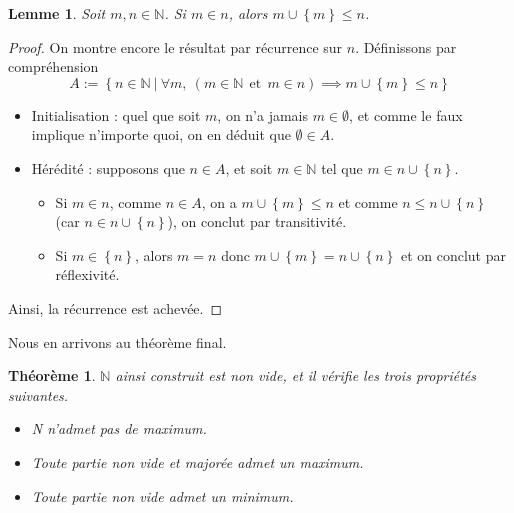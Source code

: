 \documentclass[french]{book}
\newcommand{\N}{\mathbb{N}}
\theoremstyle{plain}
\newtheorem{thm}{Théorème}[chapter]
\newtheorem{lem}{Lemme}[chapter]
\theoremstyle{definition}
\theoremstyle{remark}
\begin{document}
\begin{lem}
	Soit $m,n\in\N$. Si $m\in n$, alors $m\cup\left\{m\right\}\leqslant n$.
\end{lem}
\begin{proof}
	On montre encore le résultat par récurrence sur $n$. Définissons par compréhension $$A:=\left\{n\in\N\ | \ \forall m,\ (m\in\N\ \ \text{et}\ \ m\in n)\implies m\cup\left\{m\right\}\leqslant n\right\}$$
	\begin{itemize}
		\item Initialisation : quel que soit $m$, on n'a jamais $m\in\emptyset$, et comme le faux implique n'importe quoi, on en déduit que $\emptyset\in A$.
		\item Hérédité : supposons que $n\in A$, et soit $m\in\N$ tel que $m\in n\cup\left\{n\right\}$.
		\begin{itemize}
			\item[--] Si $m\in n$, comme $n\in A$, on a $m\cup\left\{m\right\}\leqslant n$ et comme $n\leqslant n\cup\left\{n\right\}$ (car $n\in n\cup\left\{n\right\}$), on conclut par transitivité.
			\item[--] Si $m\in\left\{n\right\}$, alors $m=n$ donc $m\cup\left\{m\right\}=n\cup\left\{n\right\}$ et on conclut par réflexivité.
		\end{itemize}
	\end{itemize}
	Ainsi, la récurrence est achevée.
\end{proof}
Nous en arrivons au théorème final.
\begin{thm}
	$\N$ ainsi construit est non vide, et il vérifie les trois propriétés suivantes.
	\begin{itemize}
		\item N n'admet pas de maximum.
		\item Toute partie non vide et majorée admet un maximum.
		\item Toute partie non vide admet un minimum.
	\end{itemize}
\end{thm}
\end{document}
